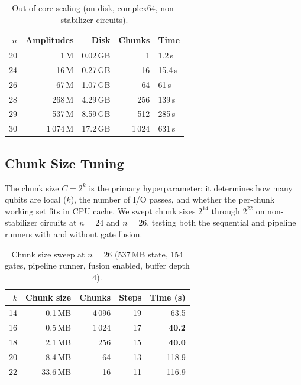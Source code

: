 \begin{table}[h]
\centering
\caption{Out-of-core scaling (on-disk, complex64, non-stabilizer circuits).}
\label{tab:scaling-ooc}
\begin{tabular}{rrrrl}
\toprule
$n$ & Amplitudes & Disk & Chunks & Time \\
\midrule
20 &        1\,M &  0.02\,GB &      1 &    1.2\,s \\
24 &       16\,M &  0.27\,GB &     16 &   15.4\,s \\
26 &       67\,M &  1.07\,GB &     64 &   61\,s \\
28 &      268\,M &  4.29\,GB &    256 &  139\,s \\
29 &      537\,M &  8.59\,GB &    512 &  285\,s \\
30 &    1\,074\,M & 17.2\,GB & 1\,024 &  631\,s \\
\bottomrule
\end{tabular}
\end{table}

\subsection{Chunk Size Tuning}
\label{sec:chunk-tuning}

The chunk size $C = 2^k$ is the primary hyperparameter: it determines
how many qubits are local ($k$), the number of I/O passes, and whether
the per-chunk working set fits in CPU cache. We swept chunk sizes
$2^{14}$ through $2^{22}$ on non-stabilizer circuits at $n = 24$ and
$n = 26$, testing both the sequential and pipeline runners with and
without gate fusion.

\begin{table}[h]
\centering
\caption{Chunk size sweep at $n = 26$ (537\,MB state, 154 gates,
pipeline runner, fusion enabled, buffer depth 4).}
\label{tab:chunk-sweep}
\begin{tabular}{rrrrr}
\toprule
$k$ & Chunk size & Chunks & Steps & Time (s) \\
\midrule
14 &   0.1\,MB & 4\,096 & 19 & 63.5 \\
16 &   0.5\,MB & 1\,024 & 17 & \textbf{40.2} \\
18 &   2.1\,MB &    256 & 15 & \textbf{40.0} \\
20 &   8.4\,MB &     64 & 13 & 118.9 \\
22 &  33.6\,MB &     16 & 11 & 116.9 \\
\bottomrule
\end{tabular}
\end{table}

